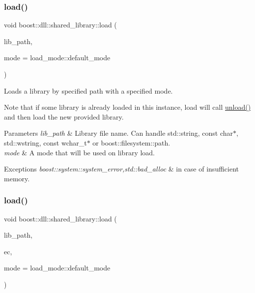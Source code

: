 \subsubsection{\texorpdfstring{load()}{load()}\hspace{0.1cm}{\footnotesize\ttfamily [1/3]}}
{\footnotesize\ttfamily void boost\+::dll\+::shared\+\_\+library\+::load (\begin{DoxyParamCaption}\item[{const boost\+::filesystem\+::path \&}]{lib\+\_\+path,  }\item[{\hyperlink{a00272_a1918a602801479bc0bade54ff5665129}{load\+\_\+mode\+::type}}]{mode = {\ttfamily load\+\_\+mode\+:\+:default\+\_\+mode} }\end{DoxyParamCaption})\hspace{0.3cm}{\ttfamily [inline]}}

Loads a library by specified path with a specified mode.

Note that if some library is already loaded in this instance, load will call \hyperlink{a01708_a0c01ab046e5dcabe4c10db2a28cbe33e}{unload()} and then load the new provided library.


\begin{DoxyParams}{Parameters}
{\em lib\+\_\+path} & Library file name. Can handle std\+::string, const char$\ast$, std\+::wstring, const wchar\+\_\+t$\ast$ or boost\+::filesystem\+::path. \\
\hline
{\em mode} & A mode that will be used on library load. \\
\hline
\end{DoxyParams}

\begin{DoxyExceptions}{Exceptions}
{\em boost\+::system\+::system\+\_\+error,std\+::bad\+\_\+alloc} & in case of insufficient memory. \\
\hline
\end{DoxyExceptions}
\mbox{\label{a01708_a6e8559f05d82d6e7f47beddd416cb734}} 
\subsubsection{\texorpdfstring{load()}{load()}\hspace{0.1cm}{\footnotesize\ttfamily [2/3]}}
{\footnotesize\ttfamily void boost\+::dll\+::shared\+\_\+library\+::load (\begin{DoxyParamCaption}\item[{const boost\+::filesystem\+::path \&}]{lib\+\_\+path,  }\item[{boost\+::system\+::error\+\_\+code \&}]{ec,  }\item[{\hyperlink{a00272_a1918a602801479bc0bade54ff5665129}{load\+\_\+mode\+::type}}]{mode = {\ttfamily load\+\_\+mode\+:\+:default\+\_\+mode} }\end{DoxyParamCaption})\hspace{0.3cm}{\ttfamily [inline]}}


